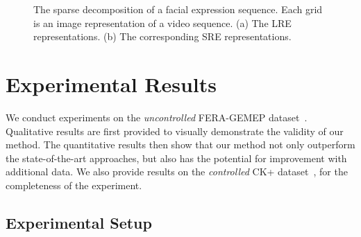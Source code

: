 \documentclass[journal]{IEEEtran}
\begin{document}
\begin{figure}[htbp]
\caption{\label{fig:rep_vs_id} The sparse decomposition of a facial expression sequence. Each grid is an image representation of a video sequence. (a) The LRE representations. (b) The corresponding SRE representations.}
\end{figure}

\section{Experimental Results\label{sec:exp}}

We conduct experiments on the \textit{uncontrolled} FERA-GEMEP dataset~\cite{FERA_data}. Qualitative results are first provided to visually demonstrate the validity of our method. The quantitative results then show that our method not only outperform the state-of-the-art approaches, but also has the potential for improvement with additional data. We also provide results on the \textit{controlled} CK+ dataset~\cite{CKplus}, for the completeness of the experiment.

\subsection{Experimental Setup}
\end{document}
